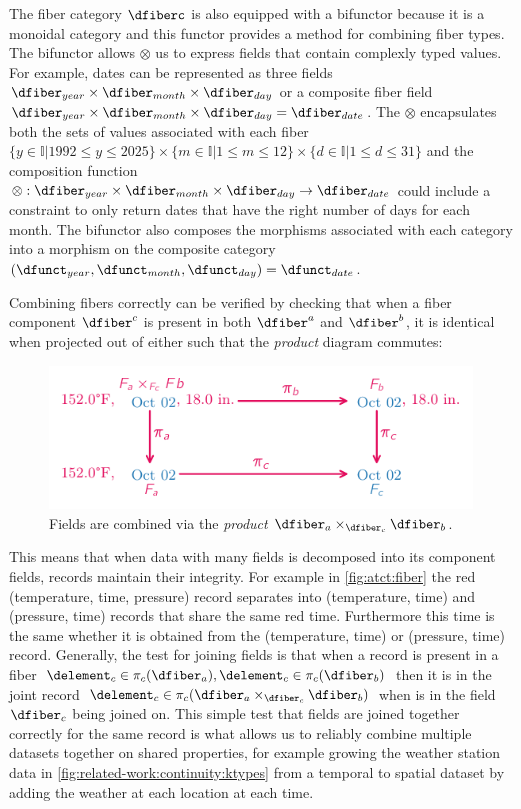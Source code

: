 \documentclass[journal]{IEEEtran}
\theoremstyle{definition}
\theoremstyle{remark}
\begin{document}
The fiber category $\mathcal{\dfiberc}$ is also equipped with a bifunctor because it is a monoidal category and this functor provides a method for combining fiber types. The bifunctor allows $\otimes$ us to express fields that contain complexly typed values. For example, dates can be represented as three fields $\dfiber_{year} \times \dfiber_{month} \times \dfiber_{day}$ or a composite fiber field $\dfiber_{year} \times \dfiber_{month} \times \dfiber_{day} = \dfiber_{date}$. The $\otimes$ encapsulates both the sets of values associated with each fiber $\{y \in \mathbb{I}\vert 1992 \leq y \leq 2025\} \times \{m \in \mathbb{I}\vert 1 \leq m \leq 12 \} \times \{d \in \mathbb{I}\vert 1 \leq d \leq 31 \}$ and the composition function $ \otimes: \dfiber_{year} \times \dfiber_{month} \times \dfiber_{day} \rightarrow \dfiber_{date}$
could include a constraint to only return dates that have the right number of days for each month. The bifunctor also composes the morphisms associated with each category into a morphism on the composite category $(\dfunct_{year}, \dfunct_{month}, \dfunct_{day}) = \dfunct_{date}$.

Combining fibers correctly can be verified by checking that when a fiber component $\dfiber^{c}$ is present in both $\dfiber^{a}$ and $\dfiber^{b}$, it is identical when projected out of either such that the \textit{product} diagram commutes:

\begin{figure}[H]
  \includegraphics*[width=1\columnwidth]{figures/tex/f_product.pdf}
  \caption{Fields are combined via the \textit{product} $\dfiber_{a}\times_{\dfiber_c} \dfiber_{b}$.}
  \label{fig:atct:fiber}
\end{figure}

This means that when data with many fields is decomposed into its component fields, records maintain their integrity. For example in \autoref{fig:atct:fiber} the red (temperature, time, pressure) record separates into (temperature, time) and (pressure, time) records that share the same red time. Furthermore this time is the same whether it is obtained from the (temperature, time) or (pressure, time) record. Generally, the test for joining fields is that when a record is present in a fiber $\delement_{c} \in \pi_c(\dfiber_{a}), \delement_c \in \pi_c(\dfiber_{b})$ then it is in the joint record $\delement_{c} \in \pi_c(\dfiber_{a}\times_{\dfiber_c}\dfiber_{b})$ when is in the field $\dfiber_c$ being joined on. This simple test that fields are joined together correctly for the same record is what allows us to reliably combine multiple datasets together on shared properties, for example growing the weather station data in \autoref{fig:related-work:continuity:ktypes} from a temporal to spatial dataset by adding the weather at each location at each time.
\end{document}
